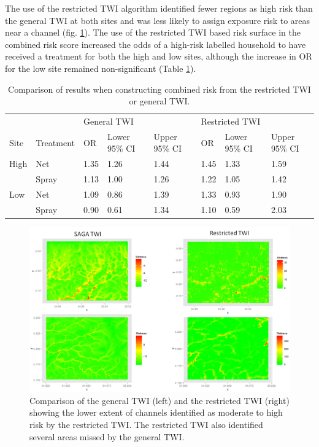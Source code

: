 \documentclass{article}\usepackage[]{graphicx}\usepackage[]{color}
\begin{document}
{The use of the restricted TWI algorithm identified fewer regions as high risk than the general TWI at both sites and was less likely to assign exposure risk to areas near a channel (fig. \ref{twis}).  The use of the restricted TWI based risk surface in the combined risk score increased the odds of a high-risk labelled household to have received a treatment for both the high and low sites,  although the increase in OR for the low site remained non-significant (Table \ref{Sens}).

  


\begin{table}[ht]
\centering
\begin{tabular}{llllllll}
  \hline
 &  & \multicolumn{3}{l}{General TWI} & \multicolumn{3}{l}{Restricted TWI}\\
Site & Treatment & OR & Lower 95\% CI & Upper 95\% CI & OR & Lower 95\% CI & Upper 95\% CI \\ 
  \hline
High & Net & 1.35 & 1.26 & 1.44 & 1.45 & 1.33 & 1.59 \\ 
   & Spray & 1.13 & 1.00 & 1.26 & 1.22 & 1.05 & 1.42 \\ 
  Low & Net & 1.09 & 0.86 & 1.39 & 1.33 & 0.93 & 1.90 \\ 
   & Spray & 0.90 & 0.61 & 1.34 & 1.10 & 0.59 & 2.03 \\ 
   \hline
\end{tabular}
\caption{Comparison of results when constructing combined risk from the restricted TWI or general TWI.} 
\label{Sens}
\end{table}

\begin{figure}
\centering
\includegraphics[scale=.5]{./figure/CompareTWI.png}
\caption{Comparison of the general TWI (left) and the restricted TWI (right) showing the lower extent of channels identified as moderate to high risk by the restricted TWI.  The restricted TWI also identified several areas missed by the general TWI. }
\label{twis}
\end{figure}



}
\end{document}
